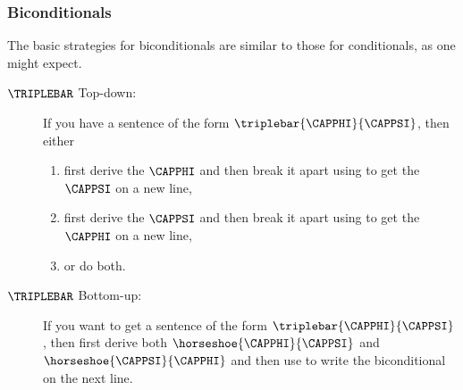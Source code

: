 \subsubsection*{Biconditionals}
The basic strategies for biconditionals are similar to those for conditionals, as one might expect.
\begin{description}
\item[$\TRIPLEBAR$ Top-down:] If you have a sentence of the form $\triplebar{\CAPPHI}{\CAPPSI}$, then either 
\begin{enumerate}
\item first derive the  $\CAPPHI$ and then break it apart using  to get the  $\CAPPSI$ on a new line,
\item first derive the  $\CAPPSI$ and then break it apart using  to get the  $\CAPPHI$ on a new line,
\item or do both.
\end{enumerate}
\item[$\TRIPLEBAR$ Bottom-up:] If you want to get a sentence of the form $\triplebar{\CAPPHI}{\CAPPSI}$, then first derive both $\horseshoe{\CAPPHI}{\CAPPSI}$ and $\horseshoe{\CAPPSI}{\CAPPHI}$ and then use  to write the biconditional on the next line.
\end{description}

